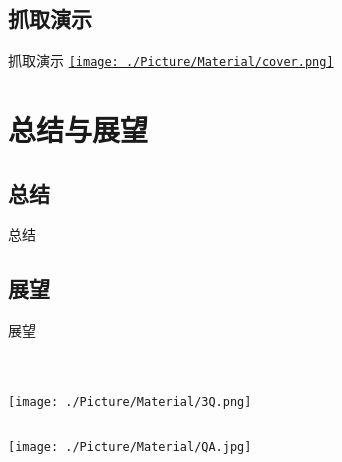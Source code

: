 \documentclass[xcolor=table,compress,blue]{beamer}
\begin{document}
	\subsection{抓取演示}
	
	\begin{frame}{抓取演示}
			\href{file://./Video/demo-grasping.mp4}{\texttt{[image: ./Picture/Material/cover.png]}}
	\end{frame}	


\section{总结与展望}	
\subsection{总结}
\begin{frame}{总结}
	
\end{frame}	
\subsection{展望}
\begin{frame}{展望}
	
\end{frame}	


\section{}
\begin{frame}[plain]
	\thispagestyle{empty}
	\begin{columns}
		\begin{column}{\paperwidth}
			\texttt{[image: ./Picture/Material/3Q.png]}
		\end{column}
	\end{columns}
\end{frame}
\begin{frame}[plain]
	\thispagestyle{empty}
	\begin{columns}
		\begin{column}{\paperwidth}
			\texttt{[image: ./Picture/Material/QA.jpg]}
		\end{column}
	\end{columns}
\end{frame}
\end{document}
